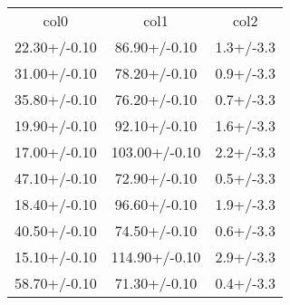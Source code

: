 \begin{table}
\begin{tabular}{ccc}
col0 & col1 & col2 \\
22.30+/-0.10 & 86.90+/-0.10 & 1.3+/-3.3 \\
31.00+/-0.10 & 78.20+/-0.10 & 0.9+/-3.3 \\
35.80+/-0.10 & 76.20+/-0.10 & 0.7+/-3.3 \\
19.90+/-0.10 & 92.10+/-0.10 & 1.6+/-3.3 \\
17.00+/-0.10 & 103.00+/-0.10 & 2.2+/-3.3 \\
47.10+/-0.10 & 72.90+/-0.10 & 0.5+/-3.3 \\
18.40+/-0.10 & 96.60+/-0.10 & 1.9+/-3.3 \\
40.50+/-0.10 & 74.50+/-0.10 & 0.6+/-3.3 \\
15.10+/-0.10 & 114.90+/-0.10 & 2.9+/-3.3 \\
58.70+/-0.10 & 71.30+/-0.10 & 0.4+/-3.3 \\
\end{tabular}
\end{table}
